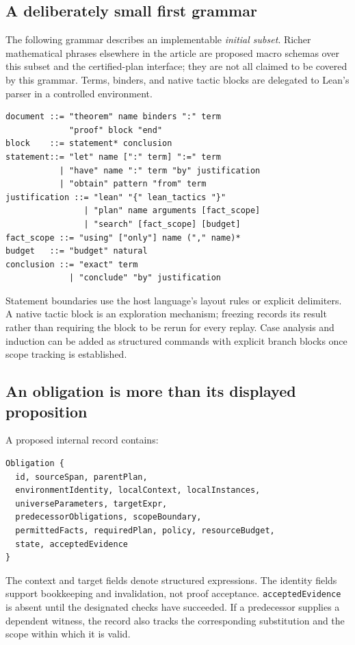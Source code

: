 \documentclass[11pt,a4paper]{article}
\newcommand{\code}[1]{\nolinkurl{#1}}
\theoremstyle{definition}
\theoremstyle{remark}
\numberwithin{equation}{section}
\begin{document}
\subsection*{A deliberately small first grammar}
The following grammar describes an implementable \emph{initial subset}. Richer mathematical phrases elsewhere in the article are proposed macro schemas over this subset and the certified-plan interface; they are not all claimed to be covered by this grammar. Terms, binders, and native tactic blocks are delegated to Lean's parser in a controlled environment.
\begin{lstlisting}[language={},caption={Illustrative grammar for the first implementation.}]
document ::= "theorem" name binders ":" term
             "proof" block "end"
block    ::= statement* conclusion
statement::= "let" name [":" term] ":=" term
           | "have" name ":" term "by" justification
           | "obtain" pattern "from" term
justification ::= "lean" "{" lean_tactics "}"
                | "plan" name arguments [fact_scope]
                | "search" [fact_scope] [budget]
fact_scope ::= "using" ["only"] name ("," name)*
budget   ::= "budget" natural
conclusion ::= "exact" term
             | "conclude" "by" justification
\end{lstlisting}
Statement boundaries use the host language's layout rules or explicit delimiters. A native tactic block is an exploration mechanism; freezing records its result rather than requiring the block to be rerun for every replay. Case analysis and induction can be added as structured commands with explicit branch blocks once scope tracking is established.

\subsection*{An obligation is more than its displayed proposition}
A proposed internal record contains:
\begin{lstlisting}[language={}]
Obligation {
  id, sourceSpan, parentPlan,
  environmentIdentity, localContext, localInstances,
  universeParameters, targetExpr,
  predecessorObligations, scopeBoundary,
  permittedFacts, requiredPlan, policy, resourceBudget,
  state, acceptedEvidence
}
\end{lstlisting}
The context and target fields denote structured expressions. The identity fields support bookkeeping and invalidation, not proof acceptance. \code{acceptedEvidence} is absent until the designated checks have succeeded. If a predecessor supplies a dependent witness, the record also tracks the corresponding substitution and the scope within which it is valid.
\end{document}
